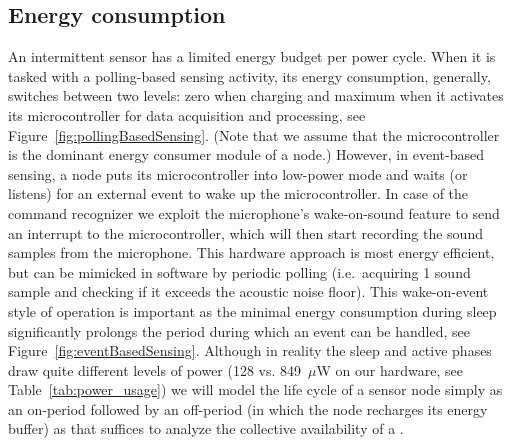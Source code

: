 
\subsection{Energy consumption}
%
An intermittent sensor has a limited energy budget per power cycle. When it is tasked with a polling-based sensing activity, its energy consumption, generally, switches between two levels: zero when charging and maximum when it activates its microcontroller for data acquisition and processing, see Figure~\ref{fig:pollingBasedSensing}. (Note that we assume that the microcontroller is the dominant energy consumer module of a node.) However, in event-based sensing, a node puts its microcontroller into low-power mode and waits (or listens) for an external event to wake up the microcontroller. In case of the command recognizer we exploit the microphone's wake-on-sound feature to send an interrupt to the microcontroller, which will then start recording the sound samples from the microphone. This hardware approach is most energy efficient, but can be mimicked in software by periodic polling (i.e.\ acquiring 1 sound sample and checking if it exceeds the acoustic noise floor). This wake-on-event style of operation is important as the minimal energy consumption during sleep significantly prolongs the period during which an event can be handled, see Figure~\ref{fig:eventBasedSensing}. Although in reality the sleep and active phases draw quite different levels of power (128 vs. 849~$\mu$W on our hardware, see Table~\ref{tab:power_usage}) we will model the life cycle of a sensor node simply as an on-period followed by an off-period (in which the node recharges its energy buffer) as that suffices to analyze the collective availability of a \sys.

